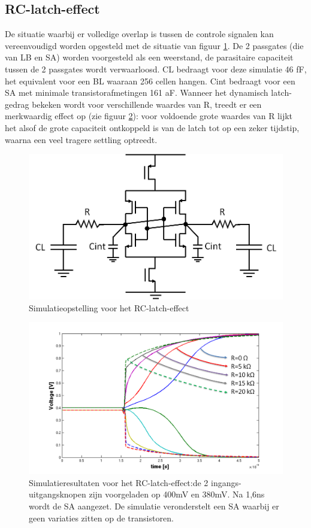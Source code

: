 \subsection{RC-latch-effect}
\label{RC-latch-effect}
De situatie waarbij er volledige overlap is tussen de controle signalen kan vereenvoudigd worden opgesteld met de situatie van figuur \ref{fig:RC-latch}. De 2 passgates (die van LB en SA) worden voorgesteld als een weerstand, de parasitaire capaciteit tussen de 2 passgates wordt verwaarloosd. CL bedraagt voor deze simulatie 46 fF, het equivalent voor een BL waaraan 256 cellen hangen. Cint bedraagt voor een SA met minimale transistorafmetingen 161 aF. Wanneer het dynamisch latch-gedrag bekeken wordt voor verschillende waardes van R, treedt er een merkwaardig effect op (zie figuur \ref{fig:RC-latch-sim}): voor voldoende grote waardes van R lijkt het alsof de grote capaciteit ontkoppeld is van de latch tot op een zeker tijdstip, waarna een veel tragere settling optreedt.
\begin{figure}
  \centering
  \includegraphics[scale=0.4]{../fig/hfdstk-sensamp-RC-latch.png}
  \caption[Simulatieopstelling voor het RC-latch-effect]{Simulatieopstelling voor het RC-latch-effect}
  \label{fig:RC-latch}
\end{figure}
\begin{figure}
  \centering
  \includegraphics[scale=0.4]{../fig/hfdstk-sensamp-RC-latch-sim.png}
  \caption[Simulatieresultaten voor het RC-latch-effect]{Simulatieresultaten voor het RC-latch-effect:de 2 ingangs-uitgangsknopen zijn voorgeladen op 400mV en 380mV. Na 1,6ns wordt de SA aangezet. De simulatie veronderstelt een SA waarbij er geen variaties zitten op de transistoren.}
  \label{fig:RC-latch-sim}
\end{figure}
